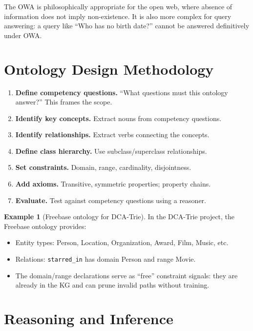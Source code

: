 \documentclass[11pt,a4paper,oneside,openany]{book}
\theoremstyle{definition}
\newtheorem{example}{Example}[chapter]
\theoremstyle{plain}
\theoremstyle{remark}
\begin{document}
The OWA is philosophically appropriate for the open web, where absence of information does not imply non-existence. It is also more complex for query answering: a query like ``Who has no birth date?'' cannot be answered definitively under OWA.

\section{Ontology Design Methodology}\label{sec:onto-design}

\begin{enumerate}
	\item \textbf{Define competency questions.} ``What questions must this ontology answer?'' This frames the scope.
	\item \textbf{Identify key concepts.} Extract nouns from competency questions.
	\item \textbf{Identify relationships.} Extract verbs connecting the concepts.
	\item \textbf{Define class hierarchy.} Use subclass/superclass relationships.
	\item \textbf{Set constraints.} Domain, range, cardinality, disjointness.
	\item \textbf{Add axioms.} Transitive, symmetric properties; property chains.
	\item \textbf{Evaluate.} Test against competency questions using a reasoner.
\end{enumerate}

\begin{example}[Freebase ontology for DCA-Trie]
	In the DCA-Trie project, the Freebase ontology provides:
	\begin{itemize}
		\item Entity types: Person, Location, Organization, Award, Film, Music, etc.
		\item Relations: \texttt{starred\_in} has domain Person and range Movie.
		\item The domain/range declarations serve as ``free'' constraint signals: they are already in the KG and can prune invalid paths without training.
	\end{itemize}
\end{example}

\section{Reasoning and Inference}\label{sec:reasoning}
\end{document}
